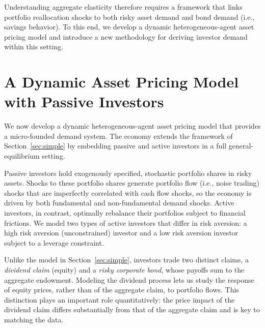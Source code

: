 \documentclass[12pt,english]{article}
\begin{document}
Understanding aggregate elasticity therefore requires a framework that links portfolio reallocation shocks to both risky asset demand and bond demand (i.e., savings behavior).
To this end, we develop a dynamic heterogeneous-agent asset pricing model and introduce a new methodology for deriving investor demand within this setting.


\section{A Dynamic Asset Pricing Model with Passive Investors}\label{sec:model}

We now develop a dynamic heterogeneous-agent asset pricing model that provides a micro-founded demand system.
The economy extends the framework of Section~\ref{sec:simple} by embedding passive and active investors in a full general-equilibrium setting.

Passive investors hold exogenously specified, stochastic portfolio shares in risky assets.
Shocks to these portfolio shares generate portfolio flow (i.e., noise trading) shocks that are imperfectly correlated with cash flow shocks, so the economy is driven by both fundamental and non-fundamental demand shocks.
Active investors, in contrast, optimally rebalance their portfolios subject to financial frictions.
We model two types of active investors that differ in risk aversion: a high risk aversion (unconstrained) investor and a low risk aversion investor subject to a leverage constraint.

Unlike the model in Section~\ref{sec:simple}, investors trade two distinct claims, a \emph{dividend claim} (equity) and a \emph{risky corporate bond}, whose payoffs sum to the aggregate endowment.
Modeling the dividend process lets us study the response of equity prices, rather than of the aggregate claim, to portfolio flows.
This distinction plays an important role quantitatively: the price impact of the dividend claim differs substantially from that of the aggregate claim and is key to matching the data.



\end{document}
